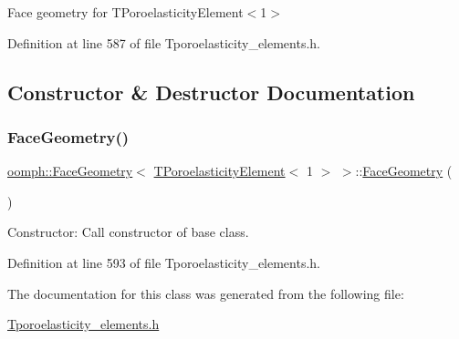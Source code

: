 Face geometry for T\+Poroelasticity\+Element$<$1$>$ 

Definition at line 587 of file Tporoelasticity\+\_\+elements.\+h.



\subsection{Constructor \& Destructor Documentation}
\mbox{\label{classoomph_1_1FaceGeometry_3_01TPoroelasticityElement_3_011_01_4_01_4_a0049267eb05c3e57d1143eac557cd746}} 
\subsubsection{\texorpdfstring{Face\+Geometry()}{FaceGeometry()}}
{\footnotesize\ttfamily \hyperlink{classoomph_1_1FaceGeometry}{oomph\+::\+Face\+Geometry}$<$ \hyperlink{classoomph_1_1TPoroelasticityElement}{T\+Poroelasticity\+Element}$<$ 1 $>$ $>$\+::\hyperlink{classoomph_1_1FaceGeometry}{Face\+Geometry} (\begin{DoxyParamCaption}{ }\end{DoxyParamCaption})\hspace{0.3cm}{\ttfamily [inline]}}



Constructor\+: Call constructor of base class. 



Definition at line 593 of file Tporoelasticity\+\_\+elements.\+h.



The documentation for this class was generated from the following file\+:\begin{DoxyCompactItemize}
\item 
\hyperlink{Tporoelasticity__elements_8h}{Tporoelasticity\+\_\+elements.\+h}\end{DoxyCompactItemize}
